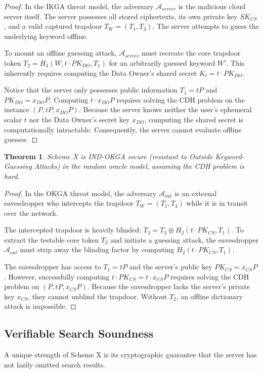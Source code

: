 \documentclass[10pt,journal,compsoc]{IEEEtran}
\newtheorem{theorem}{Theorem}
\begin{document}
\begin{proof}
In the IKGA threat model, the adversary $\mathcal{A}_{server}$ is the malicious cloud server itself. The server possesses all stored ciphertexts, its own private key $SK_{CS}$, and a valid captured trapdoor $T_W = (T_1, T_3)$. The server attempts to guess the underlying keyword offline.

To mount an offline guessing attack, $\mathcal{A}_{server}$ must recreate the core trapdoor token $T_2 = H_4(W, t \cdot PK_{DO}, T_1)$ for an arbitrarily guessed keyword $W'$. This inherently requires computing the Data Owner's shared secret $K_{t} = t \cdot PK_{DO}$. 

Notice that the server only possesses public information $T_1 = tP$ and $PK_{DO} = x_{DO}P$. Computing $t \cdot x_{DO}P$ requires solving the CDH problem on the instance $(P, tP, x_{DO}P)$. Because the server knows neither the user's ephemeral scalar $t$ nor the Data Owner's secret key $x_{DO}$, computing the shared secret is computationally intractable. Consequently, the server cannot evaluate offline guesses.
\end{proof}

\begin{theorem}
Scheme X is IND-OKGA secure (resistant to Outside Keyword-Guessing Attacks) in the random oracle model, assuming the CDH problem is hard.
\end{theorem}

\begin{proof}
In the OKGA threat model, the adversary $\mathcal{A}_{out}$ is an external eavesdropper who intercepts the trapdoor $T_W = (T_1, T_3)$ while it is in transit over the network. 

The intercepted trapdoor is heavily blinded: $T_3 = T_2 \oplus H_2(t \cdot PK_{CS}, T_1)$. To extract the testable core token $T_2$ and initiate a guessing attack, the eavesdropper $\mathcal{A}_{out}$ must strip away the blinding factor by computing $H_2(t \cdot PK_{CS}, T_1)$.

The eavesdropper has access to $T_1 = tP$ and the server's public key $PK_{CS} = x_{CS}P$. However, successfully computing $t \cdot PK_{CS} = t \cdot x_{CS}P$ requires solving the CDH problem on $(P, tP, x_{CS}P)$. Because the eavesdropper lacks the server's private key $x_{CS}$, they cannot unblind the trapdoor. Without $T_2$, an offline dictionary attack is impossible.
\end{proof}

\subsection{Verifiable Search Soundness}
A unique strength of Scheme X is its cryptographic guarantee that the server has not lazily omitted search results.
\end{document}
